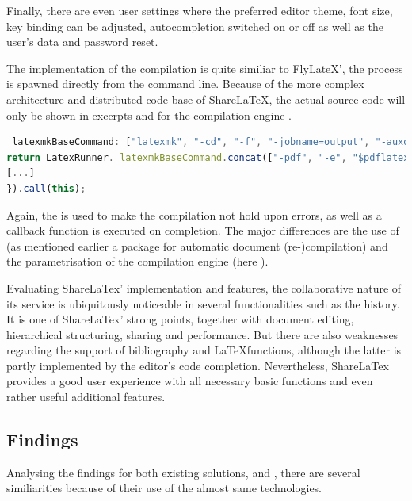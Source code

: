 Finally, there are even user settings where the preferred editor theme, font size, key binding can be adjusted, autocompletion switched on or off as well as the user's data and password reset.

The implementation of the compilation is quite similiar to FlyLateX', the process is spawned directly from the command line. Because of the more complex architecture and distributed code base of ShareLaTeX, the actual source code will only be shown in excerpts and for the compilation engine .

\pagebreak

\begin{lstlisting}[language=JavaScript, frame=none, numbers=none, caption=Latex Compilation in ShareLaTeX]
_latexmkBaseCommand: ["latexmk", "-cd", "-f", "-jobname=output", "-auxdir=$COMPILE_DIR", "-outdir=$COMPILE_DIR"]:
return LatexRunner._latexmkBaseCommand.concat(["-pdf", "-e", "$pdflatex='pdflatex -synctex=1 -interaction=batchmode %O %S'", Path.join("$COMPILE_DIR", mainFile)]);
[...]
}).call(this);
\end{lstlisting}

Again, the  is used to make the compilation not hold upon errors, as well as a callback function is executed on completion. The major differences are the use of  (as mentioned earlier a package for automatic document (re-)compilation) and the parametrisation of the compilation engine (here ).

Evaluating ShareLaTex' implementation and features, the collaborative nature of its service is ubiquitously noticeable in several functionalities such as the history. It is one of ShareLaTex' strong points, together with document editing, hierarchical structuring, sharing and performance. But there are also weaknesses regarding the support of bibliography and \LaTeX functions, although the latter is partly implemented by the editor's code completion. Nevertheless, ShareLaTex provides a good user experience with all necessary basic functions and even rather useful additional features. 

\subsection{Findings}
Analysing the findings for both existing solutions,  and , there are several similiarities because of their use of the almost same technologies. 

